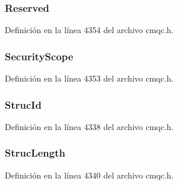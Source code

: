 \subsubsection[{Reserved}]{ Reserved}\label{structtag_m_q_i_i_h_a46c61c67b777dd2428e34fa6f407bef3}


Definición en la línea 4354 del archivo cmqc.\+h.

\hypertarget{structtag_m_q_i_i_h_a13583ad1cfb9973369dff57b50da6918}{}
\subsubsection[{Security\+Scope}]{ Security\+Scope}\label{structtag_m_q_i_i_h_a13583ad1cfb9973369dff57b50da6918}


Definición en la línea 4353 del archivo cmqc.\+h.

\hypertarget{structtag_m_q_i_i_h_a0530922ca944569b52601d74941f96e4}{}
\subsubsection[{Struc\+Id}]{ Struc\+Id}\label{structtag_m_q_i_i_h_a0530922ca944569b52601d74941f96e4}


Definición en la línea 4338 del archivo cmqc.\+h.

\hypertarget{structtag_m_q_i_i_h_a830af9a4a08c015b9a4b2d39d4d3420a}{}
\subsubsection[{Struc\+Length}]{ Struc\+Length}\label{structtag_m_q_i_i_h_a830af9a4a08c015b9a4b2d39d4d3420a}


Definición en la línea 4340 del archivo cmqc.\+h.

\hypertarget{structtag_m_q_i_i_h_aa6e8ee527bdecf4daf2b784caeebf996}{}
